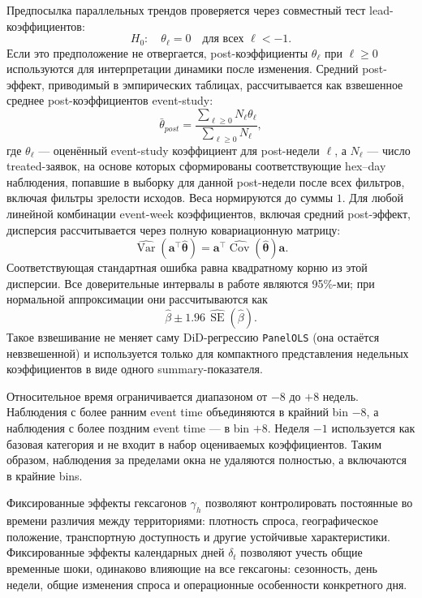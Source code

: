 \documentclass[14pt,a4paper]{extarticle}
\begin{document}
Предпосылка параллельных трендов проверяется через совместный тест lead-коэффициентов:
\[
H_0:\quad \theta_{\ell}=0 \quad \text{для всех } \ell < -1.
\]
Если это предположение не отвергается, post-коэффициенты \(\theta_{\ell}\) при \(\ell \geq 0\) используются для интерпретации динамики после изменения. Средний post-эффект, приводимый в эмпирических таблицах, рассчитывается как взвешенное среднее post-коэффициентов event-study:
\[
\bar{\theta}_{post}
=
\frac{\sum_{\ell \geq 0} N_{\ell}\theta_{\ell}}
{\sum_{\ell \geq 0} N_{\ell}},
\]
где \(\theta_{\ell}\) --- оценённый event-study коэффициент для post-недели
\(\ell\), а \(N_{\ell}\) --- число treated-заявок, на основе которых
сформированы соответствующие hex--day наблюдения, попавшие в выборку для
данной post-недели после всех фильтров, включая фильтры зрелости исходов. Веса
нормируются до суммы \(1\). Для любой линейной комбинации event-week
коэффициентов, включая средний post-эффект, дисперсия рассчитывается через
полную ковариационную матрицу:
\[
\widehat{\operatorname{Var}}\!\left(
\mathbf{a}^{\top}\widehat{\boldsymbol{\theta}}
\right)
=
\mathbf{a}^{\top}
\widehat{\operatorname{Cov}}\!\left(
\widehat{\boldsymbol{\theta}}
\right)
\mathbf{a}.
\]
Соответствующая стандартная ошибка равна квадратному корню из этой дисперсии.
Все доверительные интервалы в работе являются 95\%-ми; при нормальной
аппроксимации они рассчитываются как
\[
\widehat{\beta}
\pm
1.96\,\widehat{\operatorname{SE}}(\widehat{\beta}).
\]
Такое взвешивание не меняет саму DiD-регрессию \texttt{PanelOLS} (она остаётся
невзвешенной) и используется только для компактного представления недельных
коэффициентов в виде одного summary-показателя.

Относительное время ограничивается диапазоном от \(-8\) до \(+8\) недель. Наблюдения с более ранним event time объединяются в крайний bin \(-8\), а наблюдения с более поздним event time --- в bin \(+8\). Неделя \(-1\) используется как базовая категория и не входит в набор оцениваемых коэффициентов. Таким образом, наблюдения за пределами окна не удаляются полностью, а включаются в крайние bins.


Фиксированные эффекты гексагонов \(\gamma_h\) позволяют контролировать постоянные во времени различия между территориями: плотность спроса, географическое положение, транспортную доступность и другие устойчивые характеристики. Фиксированные эффекты календарных дней \(\delta_t\) позволяют учесть общие временные шоки, одинаково влияющие на все гексагоны: сезонность, день недели, общие изменения спроса и операционные особенности конкретного дня.
\end{document}

